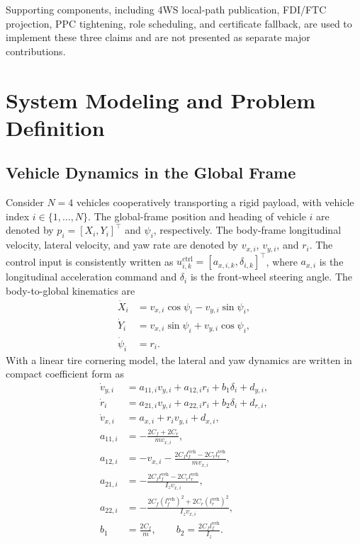 \documentclass[letterpaper,journal]{IEEEtran}
\begin{document}
Supporting components, including 4WS local-path publication, FDI/FTC projection, PPC tightening, role scheduling, and certificate fallback, are used to implement these three claims and are not presented as separate major contributions.

\section{System Modeling and Problem Definition}

\subsection{Vehicle Dynamics in the Global Frame}

Consider $N=4$ vehicles cooperatively transporting a rigid payload, with vehicle index $i\in\{1,\ldots,N\}$. The global-frame position and heading of vehicle $i$ are denoted by
$p_i=[X_i,Y_i]^\top$ and $\psi_i$, respectively. The body-frame longitudinal velocity, lateral velocity, and yaw rate are denoted by $v_{x,i}$, $v_{y,i}$, and $r_i$. The control input is consistently written as $u_{i,k}^{\mathrm{ctrl}}=[a_{x,i,k},\delta_{i,k}]^\top$, where $a_{x,i}$ is the longitudinal acceleration command and $\delta_i$ is the front-wheel steering angle. The body-to-global kinematics are
\begin{equation}
\begin{aligned}
\dot X_i &= v_{x,i}\cos\psi_i-v_{y,i}\sin\psi_i,\\
\dot Y_i &= v_{x,i}\sin\psi_i+v_{y,i}\cos\psi_i,\\
\dot \psi_i &= r_i .
\end{aligned}
\label{eq:world_kinematics}
\end{equation}
With a linear tire cornering model, the lateral and yaw dynamics are written in compact coefficient form as
\begingroup\small
\begin{equation}
\begin{aligned}
\dot v_{y,i} &=a_{11,i}v_{y,i}+a_{12,i}r_i+b_1\delta_i+d_{y,i},\\
\dot r_i &=a_{21,i}v_{y,i}+a_{22,i}r_i+b_2\delta_i+d_{r,i},\\
\dot v_{x,i} &=a_{x,i}+r_i v_{y,i}+d_{x,i},\\
a_{11,i} &=-\frac{2C_f+2C_r}{m v_{x,i}},\\
a_{12,i} &=-v_{x,i}
-\frac{2C_f l_f^{\mathrm{veh}}-2C_r l_r^{\mathrm{veh}}}{m v_{x,i}},\\
a_{21,i} &=-\frac{2C_f l_f^{\mathrm{veh}}-2C_r l_r^{\mathrm{veh}}}{I_z v_{x,i}},\\
a_{22,i} &=-\frac{2C_f (l_f^{\mathrm{veh}})^2+2C_r (l_r^{\mathrm{veh}})^2}{I_z v_{x,i}},\\
b_1&=\frac{2C_f}{m},\qquad
b_2=\frac{2C_f l_f^{\mathrm{veh}}}{I_z}.
\end{aligned}
\label{eq:bicycle_dynamics}
\end{equation}
\end{document}
